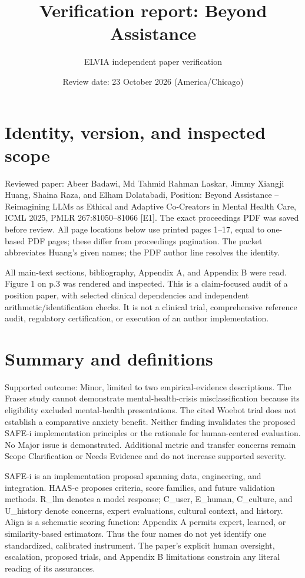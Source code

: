\documentclass[10pt]{article}
\title{Verification report: Beyond Assistance}
\author{ELVIA independent paper verification}
\date{Review date: 23 October 2026 (America/Chicago)}
\begin{document}
\maketitle
\section*{Identity, version, and inspected scope}
Reviewed paper: Abeer Badawi, Md Tahmid Rahman Laskar, Jimmy Xiangji Huang, Shaina Raza, and Elham Dolatabadi, Position: Beyond Assistance – Reimagining LLMs as Ethical and Adaptive Co-Creators in Mental Health Care, ICML 2025, PMLR 267:81050–81066 [E1]. The exact proceedings PDF was saved before review. All page locations below use printed pages 1–17, equal to one-based PDF pages; these differ from proceedings pagination. The packet abbreviates Huang’s given names; the PDF author line resolves the identity.\par
All main-text sections, bibliography, Appendix A, and Appendix B were read. Figure 1 on p.3 was rendered and inspected. This is a claim-focused audit of a position paper, with selected clinical dependencies and independent arithmetic/identification checks. It is not a clinical trial, comprehensive reference audit, regulatory certification, or execution of an author implementation.\par
\section*{Summary and definitions}
Supported outcome: Minor, limited to two empirical-evidence descriptions. The Fraser study cannot demonstrate mental-health-crisis misclassification because its eligibility excluded mental-health presentations. The cited Woebot trial does not establish a comparative anxiety benefit. Neither finding invalidates the proposed SAFE-i implementation principles or the rationale for human-centered evaluation. No Major issue is demonstrated. Additional metric and transfer concerns remain Scope Clarification or Needs Evidence and do not increase supported severity.\par
SAFE-i is an implementation proposal spanning data, engineering, and integration. HAAS-e proposes criteria, score families, and future validation methods. R\_llm denotes a model response; C\_user, E\_human, C\_culture, and U\_history denote concerns, expert evaluations, cultural context, and history. Align is a schematic scoring function: Appendix A permits expert, learned, or similarity-based estimators. Thus the four names do not yet identify one standardized, calibrated instrument. The paper’s explicit human oversight, escalation, proposed trials, and Appendix B limitations constrain any literal reading of its assurances.\par
\end{document}
